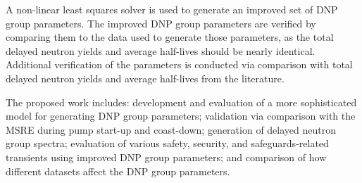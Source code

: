 A non-linear least squares solver is used to generate an improved set of \gls{DNP} group parameters.
The improved \gls{DNP} group parameters are verified by comparing them to the data used to generate those parameters, as the total delayed neutron yields and average half-lives should be nearly identical.
Additional verification of the parameters is conducted via comparison with total delayed neutron yields and average half-lives from the literature.

The proposed work includes: development and evaluation of a more sophisticated model for generating \gls{DNP} group parameters;
validation via comparison with the \gls{MSRE} during pump start-up and coast-down;
generation of delayed neutron group spectra;
evaluation of various safety, security, and safeguards-related transients using improved \gls{DNP} group parameters;
and comparison of how different datasets affect the \gls{DNP} group parameters.





